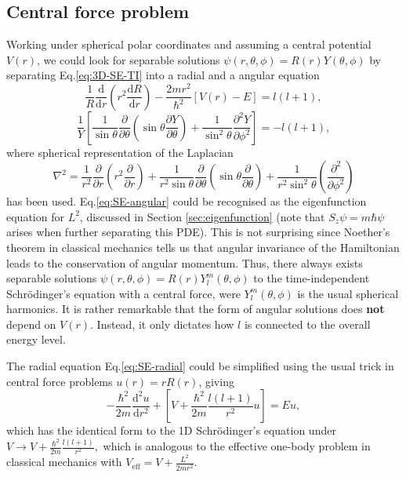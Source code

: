 \documentclass{article}
\theoremstyle{nonumberplain}
\begin{document}
\subsection{Central force problem}
Working under spherical polar coordinates and assuming a central potential $V(r)$, we could look for separable solutions $\psi (r,\theta ,\phi ) = R(r) Y(\theta ,\phi )$ by separating Eq.\eqref{eq:3D-SE-TI} into a radial and a angular equation
\begin{equation}
    \label{eq:SE-radial}
    \frac{1}{R} \frac{\mathrm{d}}{\mathrm{d}r}   \left( 
        r^2 \frac{\mathrm{d}R}{\mathrm{d}r} 
    \right) - \frac{2 m r^2 }{\hbar ^{2} } [V(r) - E] = l (l +1) ,
\end{equation}
\begin{equation}
    \label{eq:SE-angular}
    \frac{1}{Y} \left[ 
        \frac{1}{\sin \theta } \frac{\partial }{\partial \theta } \left( 
            \sin \theta \frac{\partial Y}{\partial \theta } 
        \right) + \frac{1}{\sin ^2 \theta } \frac{\partial ^2 Y }{\partial \phi ^2 }
    \right] = -l(l+1),
\end{equation}
where spherical representation of the Laplacian 
\[
    \nabla ^{2}  = 
    \frac{1}{r^{2} }\frac{\partial }{\partial r} \left( 
        r^{2}  \frac{\partial }{\partial r} 
    \right)
    + \frac{1}{r^{2} \sin \theta } \frac{\partial }{\partial \theta } \left( 
        \sin \theta  \frac{\partial }{\partial \theta } 
    \right)
    + \frac{1}{r^{2} \sin ^{2} \theta }\left( 
        \frac{\partial ^{2} }{\partial \phi ^{2} } 
    \right)
\]
has been used. Eq.\eqref{eq:SE-angular} could be recognised as the eigenfunction equation for $L^2$, discussed in Section \ref{sec:eigenfunction} (note that $S_z \psi = m \hbar \psi $ arises when further separating this PDE). This is not surprising since Noether's theorem in classical mechanics tells us that angular invariance of the Hamiltonian leads to the conservation of angular momentum. Thus, there always exists separable solutions $\psi (r,\theta ,\phi ) = R(r) Y_l^m(\theta ,\phi )$ to the time-independent Schrödinger's equation with a central force, were $Y_l^m(\theta ,\phi )$ is the usual spherical harmonics. It is rather remarkable that the form of angular solutions does \textbf{not} depend on $V(r)$. Instead, it only dictates how $l$ is connected to the overall energy level. 

The radial equation Eq.\eqref{eq:SE-radial} could be simplified using the usual trick in central force problems $\boxed{u(r) = r R(r)}$, giving 
\[
    \boxed{ 
        -\frac{\hbar ^{2} }{2 m } \frac{\mathrm{d}^{2} u}{\mathrm{d}r^{2} } + \left[ 
            V + \frac{\hbar ^{2} }{2m } \frac{l(l+1)}{r^{2} }u 
        \right]
        = E u,
    }
\]
which has the identical form to the 1D Schrödinger's equation under $V \to V +\frac{\hbar ^{2} }{2m } \frac{l(l+1)}{r^{2} },$ which is analogous to the effective one-body problem in classical mechanics with $V_{\text{eff}} = V + \frac{L^2 }{2 m r^2}. $
\end{document}
